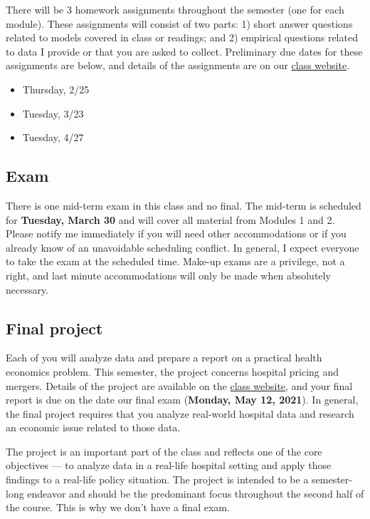 \documentclass[11pt,]{article}
\providecommand{\tightlist}{%
  \setlength{\itemsep}{0pt}\setlength{\parskip}{0pt}}
\begin{document}
There will be 3 homework assignments throughout the semester (one for
each module). These assignments will consist of two parts: 1) short
answer questions related to models covered in class or readings; and 2)
empirical questions related to data I provide or that you are asked to
collect. Preliminary due dates for these assignments are below, and
details of the assignments are on our
\href{https://econ372s21.classes.ianmccarthyecon.com/}{class website}.

\begin{itemize}
\tightlist
\item
  Thursday, 2/25
\item
  Tuesday, 3/23
\item
  Tuesday, 4/27
\end{itemize}

\hypertarget{exam}{%
\subsection{Exam}\label{exam}}

There is one mid-term exam in this class and no final. The mid-term is
scheduled for \textbf{Tuesday, March 30} and will cover all material
from Modules 1 and 2. Please notify me immediately if you will need
other accommodations or if you already know of an unavoidable scheduling
conflict. In general, I expect everyone to take the exam at the
scheduled time. Make-up exams are a privilege, not a right, and last
minute accommodations will only be made when absolutely necessary.

\hypertarget{final-project}{%
\subsection{Final project}\label{final-project}}

Each of you will analyze data and prepare a report on a practical health
economics problem. This semester, the project concerns hospital pricing
and mergers. Details of the project are available on the
\href{https://econ372s21.classes.ianmccarthyecon.com/}{class website},
and your final report is due on the date our final exam (\textbf{Monday,
May 12, 2021}). In general, the final project requires that you analyze
real-world hospital data and research an economic issue related to those
data.

The project is an important part of the class and reflects one of the
core objectives --- to analyze data in a real-life hospital setting and
apply those findings to a real-life policy situation. The project is
intended to be a semester-long endeavor and should be the predominant
focus throughout the second half of the course. This is why we don't
have a final exam.
\end{document}
